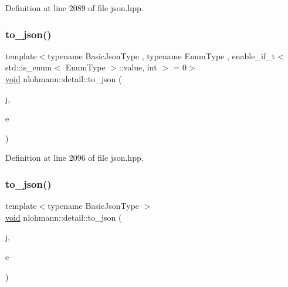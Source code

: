 Definition at line 2089 of file json.\+hpp.

\mbox{\label{namespacenlohmann_1_1detail_a0c8b159dba71981d6c555d284cf6e2bf}} 
\subsubsection{\texorpdfstring{to\_json()}{to\_json()}\hspace{0.1cm}{\footnotesize\ttfamily [7/17]}}
{\footnotesize\ttfamily template$<$typename Basic\+Json\+Type , typename Enum\+Type , enable\+\_\+if\+\_\+t$<$ std\+::is\+\_\+enum$<$ Enum\+Type $>$\+::value, int $>$  = 0$>$ \\
\mbox{\hyperlink{namespacenlohmann_1_1detail_a59fca69799f6b9e366710cb9043aa77d}{void}} nlohmann\+::detail\+::to\+\_\+json (\begin{DoxyParamCaption}\item[{Basic\+Json\+Type \&}]{j,  }\item[{Enum\+Type}]{e }\end{DoxyParamCaption})\hspace{0.3cm}{\ttfamily [noexcept]}}



Definition at line 2096 of file json.\+hpp.

\mbox{\label{namespacenlohmann_1_1detail_aeca6fb5fede5ed1e12a4420d98a5692b}} 
\subsubsection{\texorpdfstring{to\_json()}{to\_json()}\hspace{0.1cm}{\footnotesize\ttfamily [8/17]}}
{\footnotesize\ttfamily template$<$typename Basic\+Json\+Type $>$ \\
\mbox{\hyperlink{namespacenlohmann_1_1detail_a59fca69799f6b9e366710cb9043aa77d}{void}} nlohmann\+::detail\+::to\+\_\+json (\begin{DoxyParamCaption}\item[{Basic\+Json\+Type \&}]{j,  }\item[{const std\+::vector$<$ bool $>$ \&}]{e }\end{DoxyParamCaption})}



